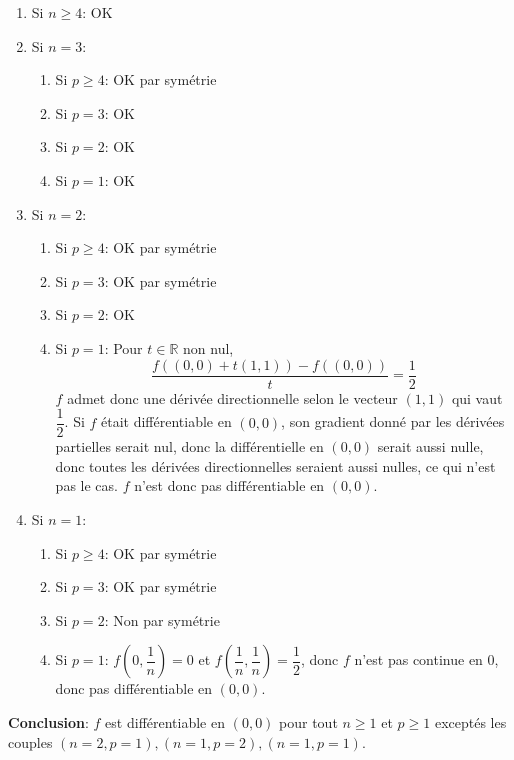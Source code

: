 \documentclass{fancybook}
\begin{document}
\begin{enumerate}
\item Si $n\geq 4$: OK 
\item Si $n=3$: \begin{enumerate}
\item Si $p\geq 4$: OK par symétrie
\item Si $p=3$: OK 
\item Si $p=2$: OK
\item Si $p=1$: OK
\end{enumerate}
\item Si $n=2$: \begin{enumerate}
\item Si $p\geq 4$: OK par symétrie
\item Si $p=3$: OK par symétrie
\item Si $p=2$: OK
\item Si $p=1$: Pour $t\in \mathbb R$ non nul, $$ \dfrac{f\left((0,0)+t(1,1)\right) - f((0,0))}{t} = \dfrac 12$$
$f$ admet donc une dérivée directionnelle selon le vecteur $(1,1)$ qui vaut $\dfrac 12$.\newline
Si $f$ était différentiable en $(0,0)$, son gradient donné par les dérivées partielles serait nul, donc la différentielle en $(0,0)$ serait aussi nulle, donc toutes les dérivées directionnelles seraient aussi nulles, ce qui n'est pas le cas. $f$ n'est donc pas différentiable en $(0,0)$.
\end{enumerate}
\item Si $n=1$: \begin{enumerate}
\item Si $p\geq 4$: OK par symétrie
\item Si $p=3$: OK par symétrie
\item Si $p=2$: Non par symétrie
\item Si $p=1$: $f(0,\dfrac{1}{n})=0$ et $f(\dfrac{1}{n},\dfrac{1}{n})=\dfrac{1}{2}$, donc $f$ n'est pas continue en $0$, donc pas différentiable en $(0,0)$.
\end{enumerate}
\end{enumerate}
\textbf{Conclusion}: $f$ est différentiable en $(0,0)$ pour tout $n\geq 1$ et $p\geq 1$ exceptés les couples $(n=2,p=1),(n=1,p=2),(n=1,p=1)$.
\end{document}
